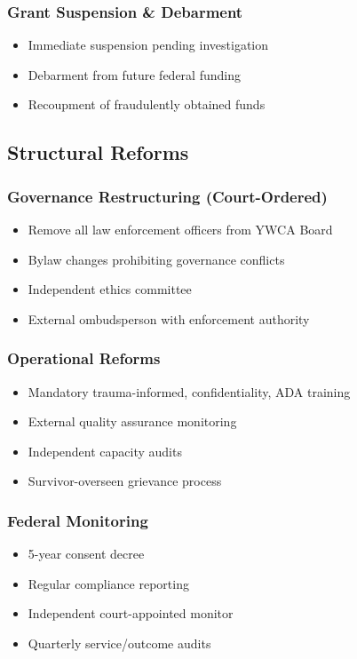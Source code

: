 \documentclass[11pt,letterpaper]{article}
\begin{document}
\subsubsection{Grant Suspension \& Debarment}
\begin{itemize}[leftmargin=*]
\item Immediate suspension pending investigation
\item Debarment from future federal funding
\item Recoupment of fraudulently obtained funds
\end{itemize}

\subsection{Structural Reforms}

\subsubsection{Governance Restructuring (Court-Ordered)}
\begin{itemize}[leftmargin=*]
\item Remove all law enforcement officers from YWCA Board
\item Bylaw changes prohibiting governance conflicts
\item Independent ethics committee
\item External ombudsperson with enforcement authority
\end{itemize}

\subsubsection{Operational Reforms}
\begin{itemize}[leftmargin=*]
\item Mandatory trauma-informed, confidentiality, ADA training
\item External quality assurance monitoring
\item Independent capacity audits
\item Survivor-overseen grievance process
\end{itemize}

\subsubsection{Federal Monitoring}
\begin{itemize}[leftmargin=*]
\item 5-year consent decree
\item Regular compliance reporting
\item Independent court-appointed monitor
\item Quarterly service/outcome audits
\end{itemize}
\end{document}
